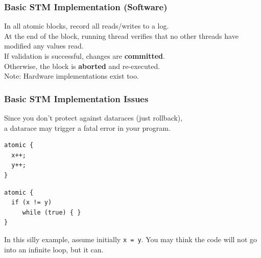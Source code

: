 \documentclass[aspectratio=43]{beamer}
\newenvironment{changemargin}[1]{%
  \begin{list}{}{%
    \setlength{\topsep}{0pt}%
    \setlength{\leftmargin}{#1}%
    \setlength{\rightmargin}{1em}
    \setlength{\listparindent}{\parindent}%
    \setlength{\itemindent}{\parindent}%
    \setlength{\parsep}{\parskip}%
  }%
  \item[]}{\end{list}}
\begin{document}
\begin{frame}
  \frametitle{Basic STM Implementation (Software)}

\begin{changemargin}{2cm}
    In all atomic blocks, record all reads/writes to a log.\\[1em]
    At the end of the block, running thread verifies that no other threads
      have modified any values read.\\[1em]
    If validation is successful, changes are {\bf committed}.\\
    Otherwise, the block is {\bf aborted} and re-executed.\\[2em]

  Note: Hardware implementations exist too.

\end{changemargin}

\end{frame}

\begin{frame}[fragile]
  \frametitle{Basic STM Implementation Issues}

\begin{changemargin}{2cm}
    Since you don't protect against dataraces (just rollback),\\
      a datarace may trigger a fatal error in your program.

  \begin{lstlisting}
atomic {
  x++;
  y++;
}
  \end{lstlisting}

  \begin{lstlisting}
atomic {
  if (x != y)
     while (true) { }
}
  \end{lstlisting}

 In this silly example, assume initially {\tt x = y}. You may think the
      code will not go into an infinite loop, but it can.
\end{changemargin}
\end{frame}
\end{document}
